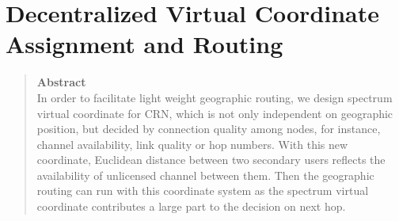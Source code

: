 \chapter{Decentralized Virtual Coordinate Assignment and Routing}
\begin{quote}
{\textbf{Abstract}\\
\small In order to facilitate light weight geographic routing, we design spectrum virtual coordinate for CRN, which is not only independent on geographic position, but decided by connection quality among nodes, for instance, channel availability, link quality or hop numbers.
With this new coordinate, Euclidean distance between two secondary users reflects the availability of unlicensed channel between them.
Then the geographic routing can run with this coordinate system as the spectrum virtual coordinate contributes a large part to the decision on next hop.
}
\end{quote}



%
%



